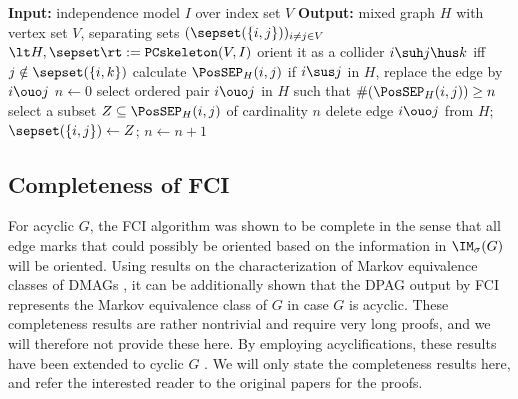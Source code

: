 \begin{algorithm}
  \begin{algorithmic}
  \State \textbf{Input:} independence model $I$ over index set $V$
  \State \textbf{Output:} mixed graph $H$ with vertex set $V$, separating sets $(\sepset(\{i,j\}))_{i\ne j \in V}$
  \State $\lt H,\sepset \rt := \mathtt{PCskeleton}(V,I)$
    \State orient it as a collider $i \suh j \hus k$ iff $j \notin \sepset(\{i,k\})$
  \EndFor
    \State calculate $\PosSEP_H(i,j)$
  \EndFor
    \State if $i \sus j$ in $H$, replace the edge by $i \ouo j$
  \EndFor
  \State $n \leftarrow 0$
    \Repeat
    \Repeat
    \State select ordered pair $i \ouo j$ in $H$ such that $\#(\PosSEP_H(i,j)) \ge n$
    \State select a subset $Z \subseteq \PosSEP_H(i,j)$ of cardinality $n$
      \State delete edge $i \ouo j$ from $H$;
      \State $\sepset(\{i,j\}) \leftarrow Z$;
    \EndIf
    \State $n \leftarrow n + 1$
  \end{algorithmic}
  \caption{FCI skeleton algorithm $\mathtt{FCIskeleton}(V,I)$.\label{alg:fci_skeleton}}
\end{algorithm}


\subsection{Completeness of FCI}

For acyclic $G$, the FCI algorithm was shown to be complete \cite{Zhang2008_AI} in the sense that all edge marks that could possibly be oriented based on the information in $\IM_\sigma(G)$ will be oriented.
Using results on the characterization of Markov equivalence classes of DMAGs \cite{Ali++2005}, it can be additionally shown that the DPAG output by FCI represents the Markov equivalence class of $G$ in case $G$ is acyclic.
These completeness results are rather nontrivial and require very long proofs, and we will therefore not provide these here.
By employing acyclifications, these results have been extended to cyclic $G$ \cite{MooijClaassen_UAI_20}.
We will only state the completeness results here, and refer the interested reader to the original papers for the proofs.

